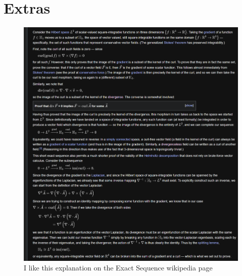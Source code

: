 \documentclass{article}
\begin{document}
\section{Extras}
\begin{figure}
    \centering
    \includegraphics[width=\textwidth]{figures/splitting.png}
    \caption{I like this explanation on the Exact Sequence wikipedia page}
\end{figure}

\end{document}
